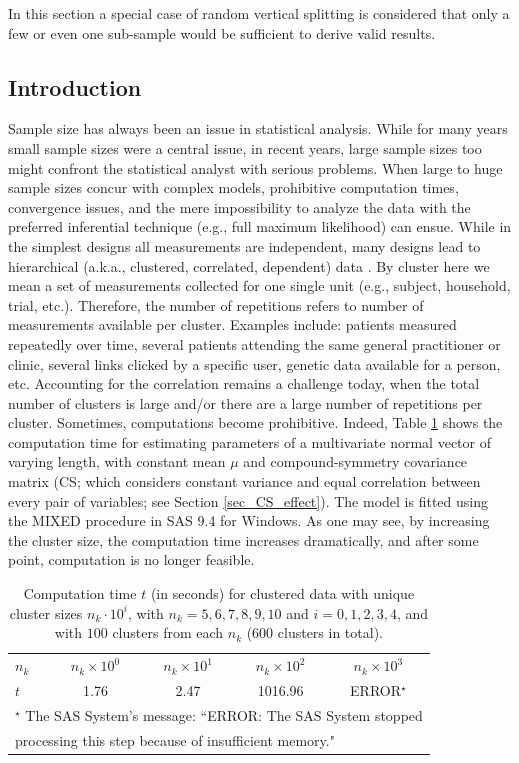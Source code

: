 \documentclass[11pt,a5paper,twoside]{book}
\begin{document}
\label{chap_FIL}
In this section a special case of random vertical splitting is considered that only a few or even one sub-sample would be sufficient to derive valid results.
\subsection{Introduction}
\label{sec_introduction}
Sample size has always been an issue in statistical analysis. While for many years small sample sizes were a central issue, in recent years, large sample sizes too might confront the statistical analyst with serious problems. When large to huge sample sizes  concur with complex models, prohibitive computation times, convergence issues, and the mere impossibility to analyze the data with the preferred inferential technique (e.g., full maximum likelihood) can ensue. While in the simplest designs all measurements are independent, many designs lead to hierarchical (a.k.a., clustered, correlated, dependent) data \cite{laird1982random,zeger1986,Molenberghs2000}. By cluster here we mean a set of measurements collected for one single unit (e.g., subject, household, trial, etc.). Therefore, the number of repetitions refers to number of measurements available per cluster. Examples include: patients measured repeatedly over time, several patients attending the same general practitioner or clinic, several links clicked by a specific user, genetic data available for a person, etc. Accounting for the correlation remains a challenge today, when the total number of clusters is large and/or there are a large number of repetitions per cluster. Sometimes, computations become prohibitive. Indeed, Table \ref{tab_sas} shows the computation time for estimating parameters of a multivariate normal vector of varying length, with constant mean $\mu$ and compound-symmetry covariance matrix (CS; which considers constant variance and equal correlation between every pair of variables; see Section \ref{sec_CS_effect}). The model is fitted using the MIXED procedure in SAS 9.4 for Windows. As one may see, by increasing the cluster size, the computation time increases dramatically, and after some point, computation is no longer feasible.
\begin{table}[ht]
\caption{Computation time $t$ (in seconds) for clustered data with unique cluster sizes $n_k\cdot 10^i$, with $n_k=5,6,7,8,9,10$ and $i=0,1,2,3,4$, and with $100$ clusters from each $n_k$ (600 clusters in total).}
\label{tab_sas}
\centering
\begin{tabular}{lcccc}
  \hline \hline
$n_k$ & $n_k\times 10^0$ & $n_k\times 10^1$ & $n_k\times 10^2$ & $n_k\times 10^3$  \\ 

$t$ & 1.76 & 2.47 & 1016.96 & ERROR$^{\star}$ \\ 
   \hline \hline
   \multicolumn{5}{l}{$^{\star}$ The SAS System's message: ``ERROR: The SAS System stopped }\\
   \multicolumn{5}{l}{processing this step because of insufficient memory."}\\
\end{tabular}
\end{table}
\end{document}
